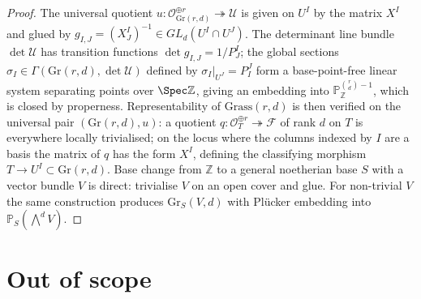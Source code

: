 \begin{proof}
  The universal quotient \(u : \mathcal{O}_{\mathrm{Gr}(r,d)}^{\oplus r}
  \twoheadrightarrow \mathcal{U}\) is given on \(U^I\) by the matrix \(X^I\)
  and glued by \(g_{I,J} = (X^I_J)^{-1} \in GL_d(U^I \cap U^J)\). The
  determinant line bundle \(\det\mathcal{U}\) has transition functions
  \(\det g_{I,J} = 1/P^I_J\); the global sections
  \(\sigma_I \in \Gamma(\mathrm{Gr}(r,d), \det\mathcal{U})\) defined by
  \(\sigma_I|_{U^J} = P^J_I\) form a base-point-free linear system separating
  points over \(\Spec\mathbb{Z}\), giving an embedding into
  \(\mathbb{P}^{\binom{r}{d}-1}_{\mathbb{Z}}\), which is closed by
  properness. Representability of \(\mathrm{Grass}(r,d)\) is then verified
  on the universal pair \((\mathrm{Gr}(r,d), u)\): a quotient
  \(q : \mathcal{O}_T^{\oplus r} \twoheadrightarrow \mathcal{F}\) of
  rank \(d\) on \(T\) is everywhere locally trivialised; on the locus where
  the columns indexed by \(I\) are a basis the matrix of \(q\) has the form
  \(X^I\), defining the classifying morphism \(T \to U^I \subset
  \mathrm{Gr}(r,d)\). Base change from \(\mathbb{Z}\) to a general noetherian
  base \(S\) with a vector bundle \(V\) is direct: trivialise \(V\) on an open
  cover and glue. For non-trivial \(V\) the same construction produces
  \(\mathrm{Gr}_S(V, d)\) with Pl\"ucker embedding into
  \(\mathbb{P}_S(\bigwedge^d V)\).
\end{proof}

\section{Out of scope}
\label{sec:quot_out_of_scope}

